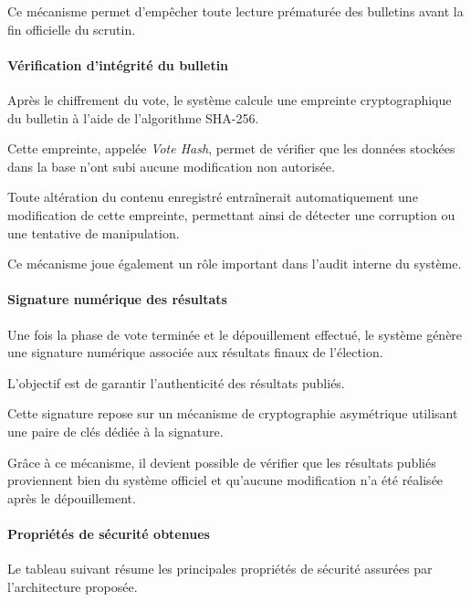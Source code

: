 ﻿\documentclass[12pt,a4paper]{report}
\begin{document}
Ce mécanisme permet d’empêcher toute lecture prématurée des bulletins avant la
fin officielle du scrutin.

\paragraph{Vérification d’intégrité du bulletin}\mbox{}

Après le chiffrement du vote, le système calcule une empreinte cryptographique
du bulletin à l’aide de l’algorithme SHA-256.

Cette empreinte, appelée \textit{Vote Hash}, permet de vérifier que les données
stockées dans la base n’ont subi aucune modification non autorisée.

Toute altération du contenu enregistré entraînerait automatiquement une
modification de cette empreinte, permettant ainsi de détecter une corruption ou
une tentative de manipulation.

Ce mécanisme joue également un rôle important dans l’audit interne du système.

\paragraph{Signature numérique des résultats}\mbox{}

Une fois la phase de vote terminée et le dépouillement effectué, le système
génère une signature numérique associée aux résultats finaux de l’élection.

L’objectif est de garantir l’authenticité des résultats publiés.

Cette signature repose sur un mécanisme de cryptographie asymétrique utilisant
une paire de clés dédiée à la signature.

Grâce à ce mécanisme, il devient possible de vérifier que les résultats publiés
proviennent bien du système officiel et qu’aucune modification n’a été réalisée
après le dépouillement.


\paragraph{Propriétés de sécurité obtenues}\mbox{}

Le tableau suivant résume les principales propriétés de sécurité assurées par
l’architecture proposée.
\end{document}
